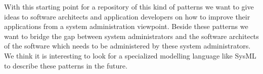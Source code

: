 With this starting point for a repository of this kind of patterns we want to give ideas to software architects and application developers on how to improve their applications from a system administration viewpoint. Beside these patterns we want to bridge the gap between system administrators and the software architects of the software which needs to be administered by these system administrators. \\
We think it is interesting to look for a specialized modelling language like SysML \cite{SysML} to describe these patterns in the future. 